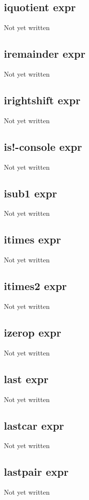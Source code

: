 \documentclass[a4paper,11pt]{article}
\begin{document}
{\subsection{\ttfamily iquotient expr}
Not yet written

\subsection{\ttfamily iremainder expr}
Not yet written

\subsection{\ttfamily irightshift expr}
Not yet written

\subsection{\ttfamily is!-console expr}
Not yet written

\subsection{\ttfamily isub1 expr}
Not yet written

\subsection{\ttfamily itimes expr}
Not yet written

\subsection{\ttfamily itimes2 expr}
Not yet written

\subsection{\ttfamily izerop expr}
Not yet written

\subsection{\ttfamily last expr}
Not yet written

\subsection{\ttfamily lastcar expr}
Not yet written

\subsection{\ttfamily lastpair expr}
Not yet written

}
\end{document}
